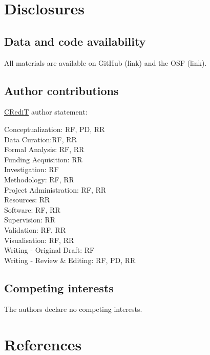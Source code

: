 \documentclass[
  letterpaper,
  DIV=11,
  numbers=noendperiod]{scrartcl}
\begin{document}
\newpage{}

\section{Disclosures}\label{disclosures}

\subsection{Data and code
availability}\label{data-and-code-availability}

All materials are available on GitHub (link) and the OSF (link).

\subsection{Author contributions}\label{author-contributions}

\href{https://www.elsevier.com/researcher/author/policies-and-guidelines/credit-author-statement}{CRediT}
author statement:

Conceptualization: RF, PD, RR\\
Data Curation:RF, RR\\
Formal Analysis: RF, RR\\
Funding Acquisition: RR\\
Investigation: RF\\
Methodology: RF, RR\\
Project Administration: RF, RR\\
Resources: RR\\
Software: RF, RR\\
Supervision: RR\\
Validation: RF, RR\\
Visualisation: RF, RR\\
Writing - Original Draft: RF\\
Writing - Review \& Editing: RF, PD, RR\\

\subsection{Competing interests}\label{competing-interests}

The authors declare no competing interests.

\newpage{}

\section{References}\label{references}
\end{document}
